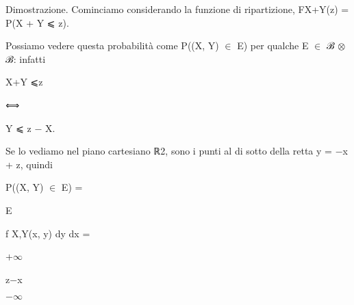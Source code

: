 \documentclass[a4paper,portrait,12pt]{article}
\begin{document}
\begin{flushleft}
Dimostrazione. Cominciamo considerando la funzione di ripartizione, FX+Y(z) = P(X + Y ⩽ z).
\end{flushleft}


\begin{flushleft}
Possiamo vedere questa probabilit\`{a} come P((X, Y) $\in$ E) per qualche E $\in$ ℬ $\otimes$ ℬ: infatti
\end{flushleft}


\begin{flushleft}
X+Y ⩽z
\end{flushleft}





⟺





\begin{flushleft}
Y ⩽ z $-$ X.
\end{flushleft}





\begin{flushleft}
Se lo vediamo nel piano cartesiano ℝ2, sono i punti al di sotto della retta y = $-$x + z, quindi
\end{flushleft}


\begin{flushleft}
P((X, Y) $\in$ E) =
\end{flushleft}





\begin{flushleft}
E
\end{flushleft}





\begin{flushleft}
f X,Y(x, y) dy dx =
\end{flushleft}





+$\infty$





\begin{flushleft}
z$-$x
\end{flushleft}





$-$$\infty$
\end{document}
